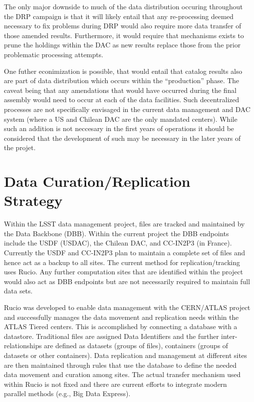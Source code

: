 The only major downside to much of the data distribution occuring throughout the DRP campaign is that it will likely entail that
any re-processing deemed necessary to fix problems during DRP would also require more data transfer of those amended results.
Furthermore, it would require that mechanisms exists to prune the holdings within the DAC as new results replace those from the 
prior problematic processing attempts.  

One futher econimization is possible, that would entail that catalog results also are part of data distribution which occurs within
the ``production'' phase.  The caveat being that any amendations that would have occurred during the final assembly would need to 
occur at each of the data facilities.  Such decentralized processes are not specifically envisaged in the current data management 
and DAC system (where a US and Chilean DAC are the only mandated centers).  While such an addition is not neccesary in the first
years of operations it should be considered that the development of such may be necessary in the later years of the projet.


\section{Data Curation/Replication Strategy\label{sec_method}}

Within the LSST data management project, files are tracked and maintained by the Data Backbone (DBB).  Within the current project
the DBB endpoints include the USDF (USDAC), the Chilean DAC, and CC-IN2P3 (in France).  Currently the USDF and CC-IN2P3 plan to 
maintain a complete set of files and hence act as a backup to all sites.  The current method for replication/tracking uses Rucio.
Any further computation sites that are identified within the project would also act as DBB endpoints but are not necessarily required
to maintain full data sets.

Rucio was developed to enable data management with the CERN/ATLAS project and successfully manages the data movement 
and replication needs within the ATLAS Tiered centers.  This is accomplished by connecting a database with a datastore.
Traditional files are assigned Data Identifiers and the further inter-relationships are defined as datasets (groups of 
files), containers (groups of datasets or other containers).   Data replication and management at different sites are then
maintained through rules that use the database to define the needed data movement and curation among sites.  The actual 
transfer mechanism used within Rucio is not fixed and there are current efforts to integrate modern parallel methods 
(e.g., Big Data Express).  

